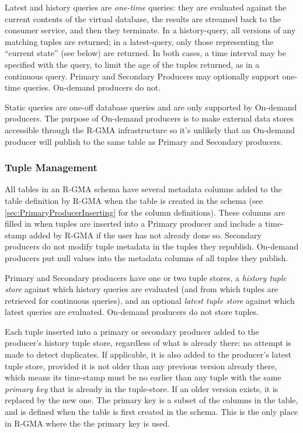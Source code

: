 Latest and history queries are \textit{one-time}
queries: they are evaluated against the current contents of the
virtual database, the results are streamed back to the consumer
service, and then they terminate. In a history-query, all versions of
any matching tuples are returned; in a latest-query, only those
representing the ``current state'' (see below) are returned. In both
cases, a time interval may be specified with the query, to limit the
age of the tuples returned, as in a continuous query. Primary and
Secondary Producers may optionally support one-time queries. On-demand
producers do not.

Static queries are one-off database queries and are only supported by
On-demand producers. The purpose of On-demand producers is to make
external data stores accessible through the R-GMA infrastructure so it's
unlikely that an On-demand producer will publish to the same table as Primary
and Secondary producers.

\subsubsection{Tuple Management}\label{sec:BackgroundTupleManagement}

All tables in an R-GMA schema have several metadata columns added to the
table definition by R-GMA when the table is created in the schema (see
\ref{sec:PrimaryProducerInserting} for the column definitions). These columns
are filled in when tuples are inserted into a Primary producer and include a
time-stamp added by R-GMA if the user has not already done so.
Secondary producers do not modify tuple metadata in the tuples they republish.
On-demand producers put null values into the metadata columns of all tuples
they publish.

Primary and Secondary producers have one or two tuple stores, 
a \textit{history tuple store} against which history queries are evaluated (and 
from which tuples are retrieved for continuous queries), and an optional 
\textit{latest tuple store} against which latest queries are evaluated. 
On-demand producers do not store tuples.

Each tuple inserted into a primary or secondary producer added to the 
producer's history tuple store, regardless of what is already there: no attempt 
is made to detect duplicates. If applicable, it is also added to the producer's 
latest tuple store, provided it is not older than any previous version already 
there, which means its time-stamp must be no earlier than any tuple with the 
same \textit{primary key} that is already in the tuple-store. If an older 
version exists, it is replaced by the new one. The primary key is a subset of 
the columns in the table, and is defined when the table is first created in the 
schema. This is the only place in R-GMA where the the primary key is used.

